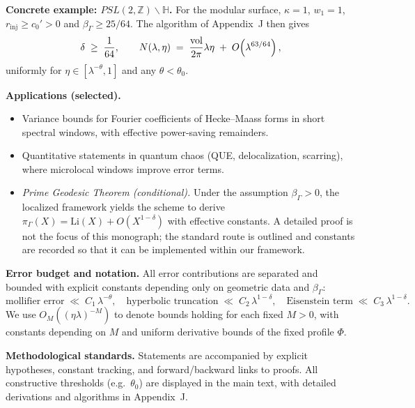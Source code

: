 \medskip
\noindent\textbf{Concrete example: $PSL(2,\mathbb{Z})\backslash\mathbb{H}$.}
For the modular surface, $\kappa=1$, $w_1=1$, $r_{\mathrm{inj}}\ge c_0'>0$ and
$\beta_\Gamma\ge 25/64$. The algorithm of Appendix~J then gives
\[
  \delta \;\ge\; \frac{1}{64},\qquad
  N(\lambda,\eta) \;=\; \frac{\operatorname{vol}}{2\pi}\lambda\eta \;+\; O\!\left(\lambda^{63/64}\right),
\]
uniformly for $\eta\in[\lambda^{-\theta},1]$ and any $\theta<\theta_0$.

\medskip
\noindent\textbf{Applications (selected).}
\begin{itemize}
  \item Variance bounds for Fourier coefficients of Hecke–Maass forms in short
  spectral windows, with effective power-saving remainders.
  \item Quantitative statements in quantum chaos (QUE, delocalization, scarring),
  where microlocal windows improve error terms.
  \item \emph{Prime Geodesic Theorem (conditional).} Under the assumption
  $\beta_\Gamma>0$, the localized framework yields the scheme to derive
  \(
    \pi_\Gamma(X) = \mathrm{Li}(X) + O\!\left(X^{1-\delta}\right)
  \)
  with effective constants. A detailed proof is not the focus of this monograph;
  the standard route is outlined and constants are recorded so that it can be
  implemented within our framework.
\end{itemize}

\medskip
\noindent\textbf{Error budget and notation.}
All error contributions are separated and bounded with explicit constants
depending only on geometric data and $\beta_\Gamma$:
\[
  \text{mollifier error} \;\ll\; C_1\,\lambda^{-\theta},\quad
  \text{hyperbolic truncation} \;\ll\; C_2\,\lambda^{1-\delta},\quad
  \text{Eisenstein term} \;\ll\; C_3\,\lambda^{1-\delta}.
\]
We use $O_M((\eta\lambda)^{-M})$ to denote bounds holding for each fixed $M>0$,
with constants depending on $M$ and uniform derivative bounds of the fixed profile $\Phi$.

\medskip
\noindent\textbf{Methodological standards.}
Statements are accompanied by explicit hypotheses, constant tracking, and
forward/backward links to proofs. All constructive thresholds (e.g.\ $\theta_0$)
are displayed in the main text, with detailed derivations and algorithms in
Appendix~J.

